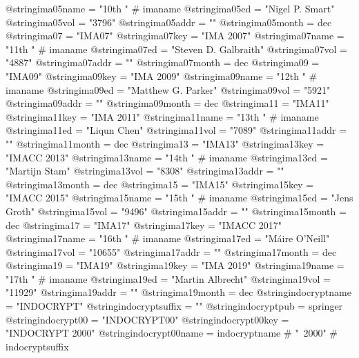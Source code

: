 @string{ima05name =             "10th " # imaname}
@string{ima05ed =               "Nigel P. Smart"}
@string{ima05vol =              "3796"}
@string{ima05addr =             ""}
@string{ima05month =            dec}
@string{ima07 =                 "IMA07"}
@string{ima07key =              "IMA 2007"}
@string{ima07name =             "11th " # imaname}
@string{ima07ed =               "Steven D. Galbraith"}
@string{ima07vol =              "4887"}
@string{ima07addr =             ""}
@string{ima07month =            dec}
@string{ima09 =                 "IMA09"}
@string{ima09key =              "IMA 2009"}
@string{ima09name =             "12th " # imaname}
@string{ima09ed =               "Matthew G. Parker"}
@string{ima09vol =              "5921"}
@string{ima09addr =             ""}
@string{ima09month =            dec}
@string{ima11 =                 "IMA11"}
@string{ima11key =              "IMA 2011"}
@string{ima11name =             "13th " # imaname}
@string{ima11ed =               "Liqun Chen"}
@string{ima11vol =              "7089"}
@string{ima11addr =             ""}
@string{ima11month =            dec}
@string{ima13 =                 "IMA13"}
@string{ima13key =              "IMACC 2013"}
@string{ima13name =             "14th " # imaname}
@string{ima13ed =               "Martijn Stam"}
@string{ima13vol =              "8308"}
@string{ima13addr =             ""}
@string{ima13month =            dec}
@string{ima15 =                 "IMA15"}
@string{ima15key =              "IMACC 2015"}
@string{ima15name =             "15th " # imaname}
@string{ima15ed =               "Jens Groth"}
@string{ima15vol =              "9496"}
@string{ima15addr =             ""}
@string{ima15month =            dec}
@string{ima17 =                 "IMA17"}
@string{ima17key =              "IMACC 2017"}
@string{ima17name =             "16th " # imaname}
@string{ima17ed =               "M{\'a}ire O'Neill"}
@string{ima17vol =              "10655"}
@string{ima17addr =             ""}
@string{ima17month =            dec}
@string{ima19 =                 "IMA19"}
@string{ima19key =              "IMA 2019"}
@string{ima19name =             "17th " # imaname}
@string{ima19ed =               "Martin Albrecht"}
@string{ima19vol =              "11929"}
@string{ima19addr =             ""}
@string{ima19month =            dec}
@string{indocryptname =         "INDOCRYPT"}
@string{indocryptsuffix =       ""}
@string{indocryptpub =          springer}
@string{indocrypt00 =           "INDOCRYPT00"}
@string{indocrypt00key =        "INDOCRYPT 2000"}
@string{indocrypt00name =       indocryptname # "~2000" # indocryptsuffix}
